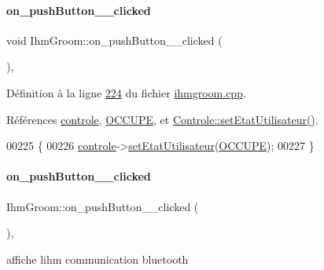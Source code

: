\paragraph{\texorpdfstring{on\+\_\+push\+Button\+\_\+\_\+clicked}{on\_pushButton\_4\_clicked}}
{\footnotesize\ttfamily void Ihm\+Groom\+::on\+\_\+push\+Button\+\_\+\_\+clicked (\begin{DoxyParamCaption}{ }\end{DoxyParamCaption})\hspace{0.3cm}{\ttfamily [private]}, {\ttfamily [slot]}}



Définition à la ligne \hyperlink{ihmgroom_8cpp_source_l00224}{224} du fichier \hyperlink{ihmgroom_8cpp_source}{ihmgroom.\+cpp}.



Références \hyperlink{ihmgroom_8h_source_l00089}{controle}, \hyperlink{ihmgroom_8h_source_l00036}{O\+C\+C\+U\+PE}, et \hyperlink{controle_8cpp_source_l00018}{Controle\+::set\+Etat\+Utilisateur()}.


\begin{DoxyCode}
00225 \{
00226     \hyperlink{class_ihm_groom_acead732c303b50a3285bd311ac8a3b4f}{controle}->\hyperlink{class_controle_a62db54114d126d03dd332332b3942320}{setEtatUtilisateur}(\hyperlink{ihmgroom_8h_a81e3b7fe26a6f7e9e070cccd7faee6bf}{OCCUPE});
00227 \}
\end{DoxyCode}
\mbox{\label{class_ihm_groom_a1bbde232f2fb38daedaa4562dfc8d1b5}} 
\paragraph{\texorpdfstring{on\+\_\+push\+Button\+\_\+\_\+clicked}{on\_pushButton\_6\_clicked}}
{\footnotesize\ttfamily Ihm\+Groom\+::on\+\_\+push\+Button\+\_\+\_\+clicked (\begin{DoxyParamCaption}{ }\end{DoxyParamCaption})\hspace{0.3cm}{\ttfamily [private]}, {\ttfamily [slot]}}



affiche l\textquotesingle{}ihm communication bluetooth 



